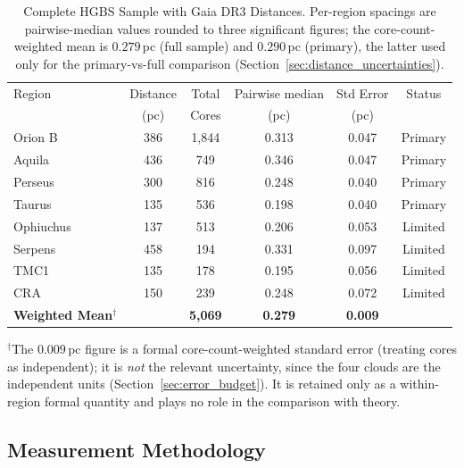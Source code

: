 \documentclass[usenatbib,twoside,twocolumn]{mnras}
\begin{document}
\begin{table}
\caption{Complete HGBS Sample with Gaia DR3 Distances. Per-region spacings are pairwise-median values rounded to three significant figures; the core-count-weighted mean is $0.279$\,pc (full sample) and $0.290$\,pc (primary), the latter used only for the primary-vs-full comparison (Section~\ref{sec:distance_uncertainties}).}
\label{tab:sample}
\begin{tabular}{lccccc}
\toprule
Region & Distance & Total & Pairwise median & Std Error & Status \\
       & (pc)   & Cores & (pc)   & (pc)      &  \\
\midrule
Orion B  & 386 & 1,844 & 0.313 & 0.047 & Primary \\
Aquila   & 436 & 749   & 0.346 & 0.047 & Primary \\
Perseus  & 300 & 816   & 0.248 & 0.040 & Primary \\
Taurus   & 135 & 536   & 0.198 & 0.040 & Primary \\
Ophiuchus& 137 & 513   & 0.206 & 0.053 & Limited \\
Serpens  & 458 & 194   & 0.331 & 0.097 & Limited \\
TMC1     & 135 & 178   & 0.195 & 0.056 & Limited \\
CRA      & 150 & 239   & 0.248 & 0.072 & Limited \\
\midrule
\textbf{Weighted Mean}$^\dagger$ &  & \textbf{5,069} & \textbf{0.279} & \textbf{0.009} &  \\
\bottomrule
\end{tabular}
\par\vspace{2pt}
\footnotesize $^\dagger$The $0.009$\,pc figure is a formal core-count-weighted standard error (treating cores as independent); it is \emph{not} the relevant uncertainty, since the four clouds are the independent units (Section~\ref{sec:error_budget}). It is retained only as a within-region formal quantity and plays no role in the comparison with theory.
\end{table}

\subsection{Measurement Methodology}
\label{sec:methodology}
\end{document}
